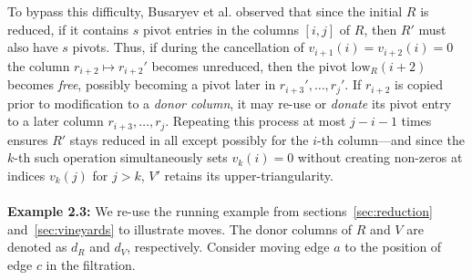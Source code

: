 \documentclass[sn-mathphys]{sn-jnl}
\begin{document}
To bypass this difficulty, Busaryev et al. observed that since the initial $R$ is reduced, if it contains $s$ pivot entries in the columns $[i,j]$ of $R$, then $R'$ must also have $s$ pivots. 
Thus, if during the cancellation  of $v_{i+1}(i) = v_{i+2}(i) = 0$ the column $r_{i+2} \mapsto r_{i+2}'$ becomes unreduced, then the pivot $\mathrm{low}_R(i+2)$ becomes \emph{free}, possibly becoming a pivot later in $r_{i+3}', \dots, r_j'$.  
If $r_{i+2}$ is copied prior to modification to a \emph{donor column}, it may re-use or \emph{donate} its pivot entry to a later column $r_{i+3}, \dots, r_j$. 
Repeating this process at most $j - i - 1$ times ensures $R'$ stays reduced in all except possibly for the $i$-th column---and since the $k$-th such operation simultaneously sets $v_{k}(i) = 0$ without creating non-zeros at indices $v_{k}(j)$ for $j > k$, $V'$ retains its upper-triangularity. 
\\
\\
\noindent \textbf{Example 2.3:} We re-use the running example from sections~\ref{sec:reduction} and~\ref{sec:vineyards} to illustrate moves. The donor columns of $R$ and $V$ are denoted as $d_R$ and $d_V$, respectively. Consider moving edge $a$ to the position of edge $c$ in the filtration. 
\end{document}

